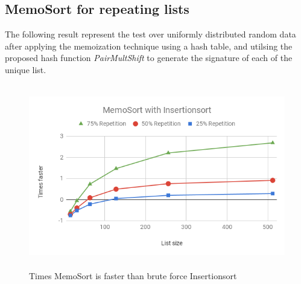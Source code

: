\documentclass[a4paper,12pt]{article}
\begin{document}
\subsection{MemoSort for repeating lists}

The following result represent the test over uniformly distributed random data after applying the memoization technique using a hash table, and utilsing the proposed hash function {\it PairMultShift}  to generate the signature of each of the unique list. \\



\begin{figure}[H]
    \centering
    \includegraphics[height=8cm,keepaspectratio]{./images/MemoSortIns.png}
    \caption{Times MemoSort is faster than brute force Insertionsort }
    \label{fig:MemoSortInsGraph}
\end{figure}
\end{document}
